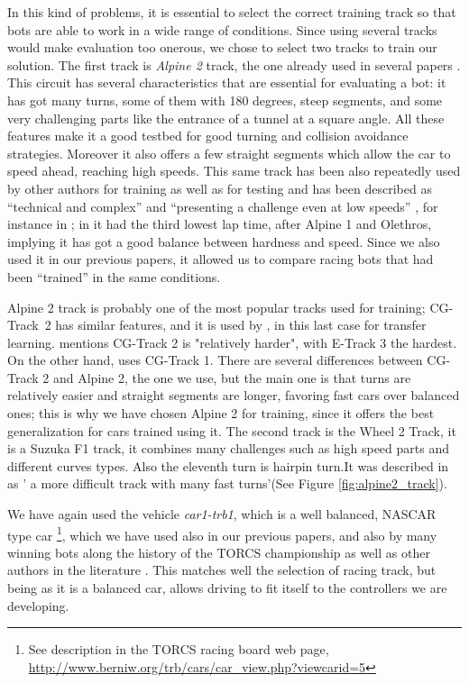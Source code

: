 \documentclass[10pt,journal,compsoc]{IEEEtran}
\begin{document}
In this kind of problems, it is essential to select the correct
training track so that bots are able to work in a wide range of
conditions. Since using several tracks would make evaluation too onerous, we chose to select two tracks to train our solution. The first track is \textit{Alpine 2} track, the one already used in several papers  \cite{salem_cig2018,DBLP:conf/cig/SalemMG19}. This circuit has several characteristics that
are essential for evaluating a bot: it has got many turns, some of
them with 180 degrees, steep segments, and some very challenging parts
like the entrance of a tunnel at a square angle. All these features make
it a good testbed for good turning and collision avoidance
strategies. Moreover it also offers a few straight segments which allow the car to speed ahead, reaching high speeds. This same track has been also repeatedly used by other authors for training as well as for testing and has been described as ``technical and complex'' \cite{AG} and ``presenting a challenge even at low speeds'' \cite{vrajitoru2018global}, for instance in
\cite{cardamone2010applying,CarRacing_Pelta09,zong2017obstacle}; in \cite{AG} it had the third lowest lap time, after Alpine 1 and Olethros, implying it
has got a good balance between hardness and speed. Since we also used
it in our previous papers, it allowed us to compare racing bots that
had been ``trained'' in the same conditions.

Alpine 2 track is probably one of the most popular tracks used for
training; \mbox{CG-Track 2} has similar features, and it is used by
\cite{mirus2019short,8833873,verma2018programmatically},
in this last case for transfer learning. \cite{Kole-ParamCarTunning12}
mentions CG-Track 2 is "relatively harder", with E-Track 3 the
hardest. On the other hand, \cite{10.1371/journal.pone.0213193} uses
CG-Track 1. There are several differences between CG-Track 2 and Alpine
2, the one we use, but the main one is that turns are relatively
easier and straight segments are longer, favoring fast cars over
balanced ones; this is why we have chosen Alpine 2 for training, since
it offers the best generalization for cars trained using it.
The second track is the Wheel 2 Track, it is a  Suzuka F1 track, it combines many challenges such as high speed  parts and different curves types. Also the eleventh turn is hairpin turn.It was  described   in \cite{wheel2track_chen} as ' a more difficult track with many fast turns'(See Figure \ref{fig:alpine2_track}).

We have again used the vehicle \textit{car1-trb1},
which is a well balanced, NASCAR type car \footnote{See description in
  the TORCS racing board web page,
  \url{http://www.berniw.org/trb/cars/car_view.php?viewcarid=5}},
which we have used also in our previous papers, and also by many
winning bots along the history of the TORCS championship
\cite{torcs5} as well as other authors in the literature
\cite{auteur2010,li2019reinforcement}. This matches well the selection
of racing track, but being as it is a balanced car, allows driving to
fit itself to the controllers we are developing.
\end{document}
